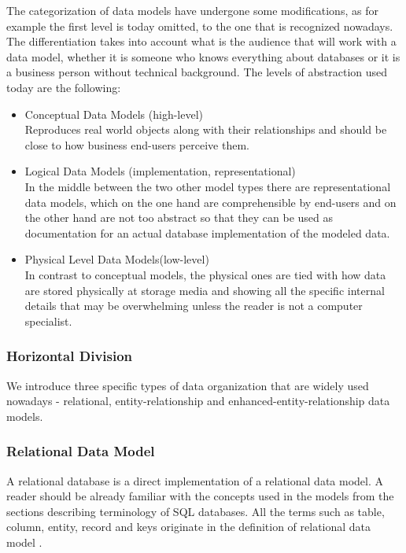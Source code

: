 The categorization of data models have undergone some modifications, as for example the first level is today omitted, to the one that is recognized nowadays. The differentiation takes into account what is the audience that will work with a data model, whether it is someone who knows everything about databases or it is a business person without technical background. The levels of abstraction used today\cite{SilberschatzKorthSudarshan10} are the following: 
\begin{itemize}
	\item Conceptual Data Models (high-level) \\
	Reproduces real world objects along with their relationships and should be close to how business end-users perceive them.
	
	\item Logical Data Models (implementation, representational) \\
	In the middle between the two other model types there are representational data models, which on the one hand are comprehensible by end-users and on the other hand are not too abstract so that they can be used as documentation for an actual database implementation of the modeled data.
	
	\item Physical Level Data Models(low-level) \\
	In contrast to conceptual models, the physical ones are tied with how data are stored physically at storage media and showing all the specific internal details that may be overwhelming unless the reader is not a computer specialist.
\end{itemize}

\subsubsection{Horizontal Division}

We introduce three specific types of data organization that are widely used nowadays - relational, entity-relationship and enhanced-entity-relationship data models.

\subsubsection{Relational Data Model}

A relational database is a direct implementation of a relational data model. A reader should be already familiar with the concepts used in the models from the sections describing terminology of SQL databases. All the terms such as table, column, entity, record and keys originate in the definition of relational data model \cite{Codd69}.

